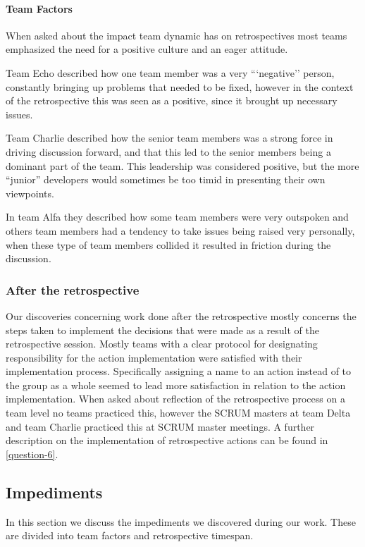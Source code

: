 \paragraph{Team Factors}
\label{question-20}
When asked about the impact team dynamic has on retrospectives most teams emphasized the need for a positive culture and an eager attitude. 

Team Echo described how one team member was a very ```negative'' person, constantly bringing up problems that needed to be fixed, however in the context of the retrospective this was seen as a positive, since it brought up necessary issues. 

Team Charlie described how the senior team members was a strong force in driving discussion forward, and that this led to the senior members being a dominant part of the team. This leadership was considered positive, but the more ``junior'' developers would sometimes be too timid in presenting their own viewpoints. 

In team Alfa they described how some team members were very outspoken and others team members had a tendency to take issues being raised very personally, when these type of team members collided it resulted in friction during the discussion. 

\subsubsection{After the retrospective}
Our discoveries concerning work done after the retrospective mostly concerns the steps taken to implement the decisions that were made as a result of the retrospective session. Mostly teams with a clear protocol for designating responsibility for the action implementation were satisfied with their implementation process. Specifically assigning a name to an action instead of to the group as a whole seemed to lead more satisfaction in relation to the action implementation. When asked about reflection of the retrospective process on a team level no teams practiced this, however the SCRUM masters at team Delta and team Charlie practiced this at SCRUM master meetings. A further description on the implementation of retrospective actions can be found in \autoref{question-6}.

\subsection{Impediments}

In this section we discuss the impediments we discovered during our work. These are divided into team factors and retrospective timespan.

